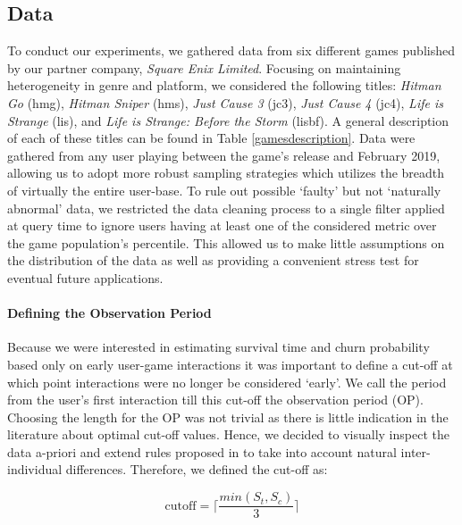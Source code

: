 \subsection{Data}
\label{data_1}
To conduct our experiments, we gathered data from six different games published by our partner company, \textit{Square Enix Limited}. Focusing on maintaining heterogeneity in genre and platform, we considered the following titles: \emph{Hitman Go} (hmg), \emph{Hitman Sniper} (hms), \emph{Just Cause 3} (jc3), \emph{Just Cause 4} (jc4), \emph{Life is Strange} (lis), and \emph{Life is Strange: Before the Storm} (lisbf). A general description of each of these titles can be found in Table \ref{gamesdescription}. Data were gathered from any user playing between the game's release and February 2019, allowing us to adopt more robust sampling strategies which utilizes the breadth of virtually the entire user-base. To rule out possible `faulty' but not `naturally abnormal' data, we restricted the data cleaning process to a single filter applied at query time to ignore users having at least one of the considered metric over the game population's  percentile. This allowed us to make little assumptions on the distribution of the data as well as providing a convenient stress test for eventual future applications.



\paragraph*{Defining the Observation Period}
Because we were interested in estimating survival time and churn probability based only on early user-game interactions it was important to define a cut-off at which point interactions were no longer be considered `early'. We call the period from the user's first interaction till this cut-off the observation period (OP). Choosing the length for the OP was not trivial as there is little indication in the literature about optimal cut-off values. Hence, we decided to visually inspect the data a-priori and extend rules proposed in \cite{drachen2016rapid, milovsevic2017early} to take into account natural inter-individual differences. Therefore, we defined the cut-off as:

\begin{equation}
\label{CutoffOP}
    \text{cutoff} = 
    \Biggl\lceil
        \dfrac
            {min(S_t, S_c)}
            {3}
    \Biggr\rceil
\end{equation}

